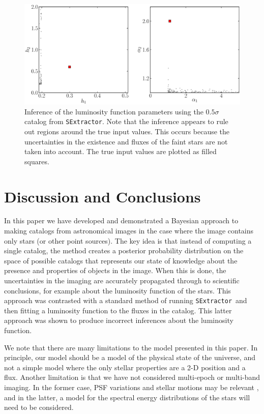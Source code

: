 \documentclass[12pt, preprint]{aastex}
\newcommand{\sex}{{\tt SExtractor}}
\begin{document}
\begin{figure}[ht!]
\begin{center}
\includegraphics[width=\textwidth]{Figures/sex_inference.eps}
\end{center}
\caption{Inference of the luminosity function parameters using the $0.5\sigma$
catalog from \sex. Note that the inference appears to rule out regions around
the true input values. This occurs because the uncertainties in the existence
and fluxes of the faint stars are not taken into account. The true input values are plotted as filled squares.
\label{fig:sex_inference}}
\end{figure}

\section{Discussion and Conclusions}\label{sec:conclusion}

In this paper we have developed and demonstrated a Bayesian approach to
making catalogs from astronomical images in the case where the image contains
only stars (or other point sources). The key idea is that instead of computing
a single catalog, the method creates a posterior probability distribution on
the space of possible catalogs that represents our state of knowledge about
the presence and properties of objects in the image. When this is done, the
uncertainties in the imaging are accurately propagated through to scientific
conclusions, for example about the luminosity function of the stars.
This approach was contrasted with a standard method of running \sex~and then
fitting a luminosity function to the fluxes in the catalog. This latter approach
was shown to produce incorrect inferences about the luminosity function.

We note that there are many limitations to the model presented in this paper.
In principle, our model should be a model of the physical state of the universe,
and not a simple model where the only stellar properties are a 2-D position and
a flux. Another limitation is that we have not considered multi-epoch or multi-band
imaging. In the former case, PSF variations and stellar motions may be relevant
\citep{lang}, and in the latter, a model for the spectral energy distributions
of the stars will need to be considered.
\end{document}
